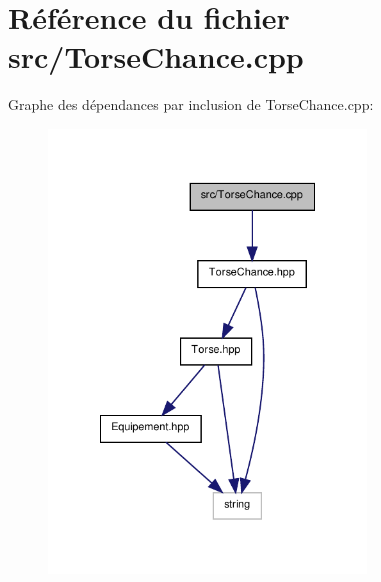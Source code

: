 \section{Référence du fichier src/\-Torse\-Chance.cpp}
\label{_torse_chance_8cpp}
Graphe des dépendances par inclusion de Torse\-Chance.\-cpp\-:\nopagebreak
\begin{figure}[H]
\begin{center}
\leavevmode
\includegraphics[width=239pt]{_torse_chance_8cpp__incl}
\end{center}
\end{figure}
